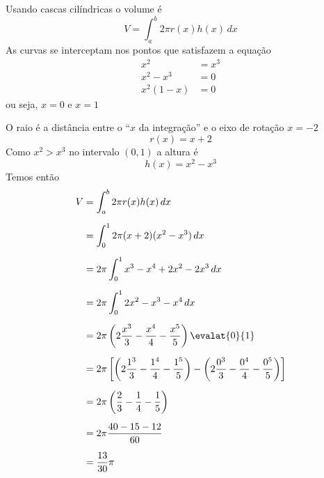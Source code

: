 \documentclass[a4paper,12pt,fleqn]{article}
\begin{document}
\begin{answer}
  Usando cascas cilíndricas o volume é
  \[
    V = \int_a^b 2\pi r(x) h(x) \,dx
  \]
  As curvas se interceptam nos pontos que satisfazem a equação
  \begin{align*}
    x^2       & = x^3 \\
    x^2 - x^3 & = 0   \\
    x^2(1-x)  & = 0
  \end{align*}
  ou seja, \(x=0\) e \(x=1\)

  O raio é a distância entre o ``$x$ da integração'' e o eixo de rotação \(x=-2\)
  \[
    r(x) = x+2
  \]
  Como \(x^2>x^3\) no intervalo \((0, 1)\) a altura é
  \[
    h(x) = x^2-x^3
  \]
  Temos então
  \begin{align*}
    V & = \int_a^b 2\pi r(x) h(x) \,dx \\[2mm]
      & = \int_0^1 2\pi (x+2) (x^2-x^3) \,dx \\[2mm]
      & = 2\pi \int_0^1 x^3 -x^4 + 2x^2 -2x^3 \,dx \\[2mm]
      & = 2\pi \int_0^1 2x^2 -x^3 -x^4 \,dx \\[2mm]
      & = 2\pi \left(2\frac{x^3}{3} - \frac{x^4}{4} -\frac{x^5}{5}\right)\evalat{0}{1} \\[2mm]
      & = 2\pi \left[
                 \left(2\frac{1^3}{3} -\frac{1^4}{4} - \frac{1^5}{5}\right)
                -\left(2\frac{0^3}{3} -\frac{0^4}{4} - \frac{0^5}{5}\right)
               \right] \\[2mm]
      & = 2\pi \left(\frac{2}{3} -\frac{1}{4} - \frac{1}{5} \right) \\[2mm]
      & = 2\pi \frac{40-15-12}{60} \\[2mm]
      & = \frac{13}{30}\pi
  \end{align*}
\end{answer}

\end{document}
